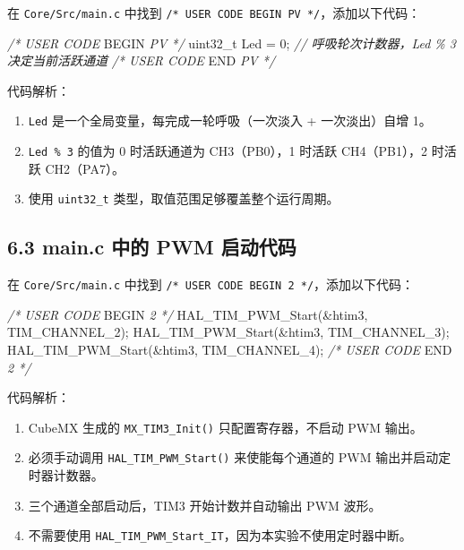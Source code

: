 \documentclass[
  chinese,
  UTF8,
  oneside,
  openany]{ctexbook}
\newenvironment{Shaded}{}{}
\newcommand{\CommentTok}[1]{\textcolor[rgb]{0.38,0.63,0.69}{\textit{#1}}}
\newcommand{\DataTypeTok}[1]{\textcolor[rgb]{0.56,0.13,0.00}{#1}}
\newcommand{\DecValTok}[1]{\textcolor[rgb]{0.25,0.63,0.44}{#1}}
\newcommand{\NormalTok}[1]{#1}
\newcommand{\OperatorTok}[1]{\textcolor[rgb]{0.40,0.40,0.40}{#1}}
\newcommand{\RegionMarkerTok}[1]{#1}
\providecommand{\tightlist}{%
  \setlength{\itemsep}{0pt}\setlength{\parskip}{0pt}}
\begin{document}
在 \texttt{Core/Src/main.c} 中找到
\texttt{/*\ USER\ CODE\ BEGIN\ PV\ */}，添加以下代码：

\begin{Shaded}
\begin{Highlighting}[]
\CommentTok{/* USER CODE }\RegionMarkerTok{BEGIN}\CommentTok{ PV */}
\DataTypeTok{uint32\_t}\NormalTok{ Led }\OperatorTok{=} \DecValTok{0}\OperatorTok{;}   \CommentTok{// 呼吸轮次计数器，Led \% 3 决定当前活跃通道}
\CommentTok{/* USER CODE }\RegionMarkerTok{END}\CommentTok{ PV */}
\end{Highlighting}
\end{Shaded}

代码解析：

\begin{enumerate}
\def\labelenumi{\arabic{enumi}.}
\tightlist
\item
  \texttt{Led} 是一个全局变量，每完成一轮呼吸（一次淡入 + 一次淡出）自增
  1。
\item
  \texttt{Led\ \%\ 3} 的值为 0 时活跃通道为 CH3（PB0），1 时活跃
  CH4（PB1），2 时活跃 CH2（PA7）。
\item
  使用 \texttt{uint32\_t} 类型，取值范围足够覆盖整个运行周期。
\end{enumerate}

\subsection{6.3 main.c 中的 PWM
启动代码}\label{main.c-ux4e2dux7684-pwm-ux542fux52a8ux4ee3ux7801}

在 \texttt{Core/Src/main.c} 中找到
\texttt{/*\ USER\ CODE\ BEGIN\ 2\ */}，添加以下代码：

\begin{Shaded}
\begin{Highlighting}[]
\CommentTok{/* USER CODE }\RegionMarkerTok{BEGIN}\CommentTok{ 2 */}
\NormalTok{HAL\_TIM\_PWM\_Start}\OperatorTok{(\&}\NormalTok{htim3}\OperatorTok{,}\NormalTok{ TIM\_CHANNEL\_2}\OperatorTok{);}
\NormalTok{HAL\_TIM\_PWM\_Start}\OperatorTok{(\&}\NormalTok{htim3}\OperatorTok{,}\NormalTok{ TIM\_CHANNEL\_3}\OperatorTok{);}
\NormalTok{HAL\_TIM\_PWM\_Start}\OperatorTok{(\&}\NormalTok{htim3}\OperatorTok{,}\NormalTok{ TIM\_CHANNEL\_4}\OperatorTok{);}
\CommentTok{/* USER CODE }\RegionMarkerTok{END}\CommentTok{ 2 */}
\end{Highlighting}
\end{Shaded}

代码解析：

\begin{enumerate}
\def\labelenumi{\arabic{enumi}.}
\tightlist
\item
  CubeMX 生成的 \texttt{MX\_TIM3\_Init()} 只配置寄存器，不启动 PWM
  输出。
\item
  必须手动调用 \texttt{HAL\_TIM\_PWM\_Start()} 来使能每个通道的 PWM
  输出并启动定时器计数器。
\item
  三个通道全部启动后，TIM3 开始计数并自动输出 PWM 波形。
\item
  不需要使用
  \texttt{HAL\_TIM\_PWM\_Start\_IT}，因为本实验不使用定时器中断。
\end{enumerate}
\end{document}
